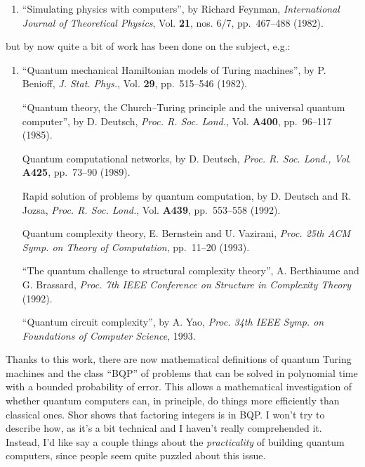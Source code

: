 \documentclass{article}
\def\tightlist{}
\begin{document}
\begin{enumerate}
\def\labelenumi{\arabic{enumi})}
\setcounter{enumi}{1}
\tightlist
\item
  ``Simulating physics with computers'', by Richard Feynman,
  \emph{International Journal of Theoretical Physics}, Vol. \textbf{21},
  nos. 6/7, pp.~467--488 (1982).
\end{enumerate}

but by now quite a bit of work has been done on the subject, e.g.:

\begin{enumerate}
\def\labelenumi{\arabic{enumi})}
\setcounter{enumi}{2}
\item
  ``Quantum mechanical Hamiltonian models of Turing machines'', by P.
  Benioff, \emph{J. Stat. Phys.}, Vol. \textbf{29}, pp.~515--546 (1982).

  ``Quantum theory, the Church--Turing principle and the universal
  quantum computer'', by D. Deutsch, \emph{Proc. R. Soc. Lond.}, Vol.
  \textbf{A400}, pp.~96--117 (1985).

  Quantum computational networks, by D. Deutsch, \emph{Proc. R. Soc.
  Lond., Vol}. \textbf{A425}, pp.~73--90 (1989).

  Rapid solution of problems by quantum computation, by D. Deutsch and
  R. Jozsa, \emph{Proc. R. Soc. Lond.}, Vol. \textbf{A439}, pp.~553--558
  (1992).

  Quantum complexity theory, E. Bernstein and U. Vazirani, \emph{Proc.
  25th ACM Symp. on Theory of Computation}, pp.~11--20 (1993).

  ``The quantum challenge to structural complexity theory'', A.
  Berthiaume and G. Brassard, \emph{Proc. 7th IEEE Conference on
  Structure in Complexity Theory} (1992).

  ``Quantum circuit complexity'', by A. Yao, \emph{Proc. 34th IEEE Symp.
  on Foundations of Computer Science}, 1993.
\end{enumerate}

Thanks to this work, there are now mathematical definitions of quantum
Turing machines and the class ``BQP'' of problems that can be solved in
polynomial time with a bounded probability of error. This allows a
mathematical investigation of whether quantum computers can, in
principle, do things more efficiently than classical ones. Shor shows
that factoring integers is in BQP. I won't try to describe how, as it's
a bit technical and I haven't really comprehended it. Instead, I'd like
say a couple things about the \emph{practicality} of building quantum
computers, since people seem quite puzzled about this issue.
\end{document}
